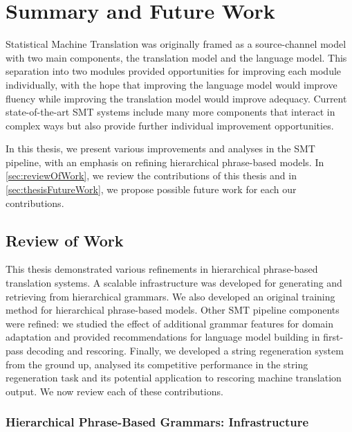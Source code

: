 \chapter{Summary and Future Work}


Statistical Machine Translation was originally framed as a source-channel
model with two main components, the translation model and the
language model. This separation into two modules provided opportunities
for improving each module individually, with the hope that improving the language model
would improve fluency while improving the translation model would improve
adequacy. Current state-of-the-art SMT systems include many more components
that interact in complex ways but also provide further individual improvement
opportunities.

In this thesis, we present various improvements and analyses in the
SMT pipeline, with an emphasis on refining hierarchical phrase-based
models. In \autoref{sec:reviewOfWork}, we review the contributions of
this thesis and in \autoref{sec:thesisFutureWork}, we propose
possible future work for each our contributions.

\section{Review of Work}
\label{sec:reviewOfWork}

This thesis demonstrated various refinements in
hierarchical phrase-based translation systems.
A scalable infrastructure was developed for generating
and retrieving from hierarchical grammars. We also
developed an original training method for hierarchical
phrase-based models. Other SMT pipeline components
were refined: we studied the effect of additional
grammar features for domain adaptation and provided recommendations
for language model building in first-pass decoding and rescoring.
Finally, we developed a string regeneration system from the
ground up, analysed its competitive performance in
the string regeneration task and its potential application to
rescoring machine translation output. We now review each of
these contributions.

\subsection{Hierarchical Phrase-Based Grammars: Infrastructure}

